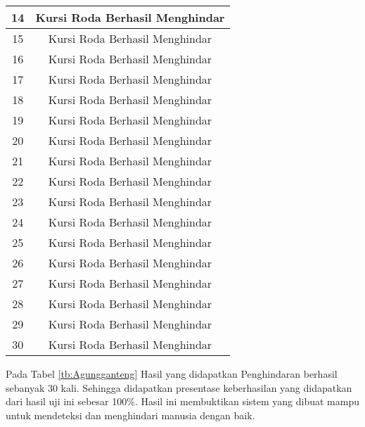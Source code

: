 \begin{table}[H]
\begin{tabular}{|c|c|}
    14        & \cellcolor[HTML]{9AFF99}Kursi Roda Berhasil Menghindar              \\ \hline
    15        & \cellcolor[HTML]{9AFF99}Kursi Roda Berhasil Menghindar              \\ \hline
    16        & \cellcolor[HTML]{9AFF99}Kursi Roda Berhasil Menghindar              \\ \hline
    17        & \cellcolor[HTML]{9AFF99}Kursi Roda Berhasil Menghindar              \\ \hline
    18        & \cellcolor[HTML]{9AFF99}Kursi Roda Berhasil Menghindar              \\ \hline
    19        & \cellcolor[HTML]{9AFF99}Kursi Roda Berhasil Menghindar              \\ \hline
    20        & \cellcolor[HTML]{9AFF99}Kursi Roda Berhasil Menghindar              \\ \hline
    21        & \cellcolor[HTML]{9AFF99}Kursi Roda Berhasil Menghindar              \\ \hline
    22        & \cellcolor[HTML]{9AFF99}Kursi Roda Berhasil Menghindar              \\ \hline
    23        & \cellcolor[HTML]{9AFF99}Kursi Roda Berhasil Menghindar              \\ \hline
    24        & \cellcolor[HTML]{9AFF99}Kursi Roda Berhasil Menghindar              \\ \hline
    25        & \cellcolor[HTML]{9AFF99}Kursi Roda Berhasil Menghindar              \\ \hline
    26        & \cellcolor[HTML]{9AFF99}Kursi Roda Berhasil Menghindar              \\ \hline
    27        & \cellcolor[HTML]{9AFF99}Kursi Roda Berhasil Menghindar              \\ \hline
    28        & \cellcolor[HTML]{9AFF99}Kursi Roda Berhasil Menghindar              \\ \hline
    29        & \cellcolor[HTML]{9AFF99}Kursi Roda Berhasil Menghindar              \\ \hline
    30        & \cellcolor[HTML]{9AFF99}Kursi Roda Berhasil Menghindar              \\ \hline
    \end{tabular}
    \end{table}

Pada Tabel \ref{tb:Agungganteng} Hasil yang didapatkan Penghindaran berhasil sebanyak 30 kali. Sehingga didapatkan presentase keberhasilan yang didapatkan dari hasil uji ini sebesar 100\%. Hasil ini membuktikan sistem yang dibuat mampu untuk mendeteksi dan menghindari manusia dengan baik.

